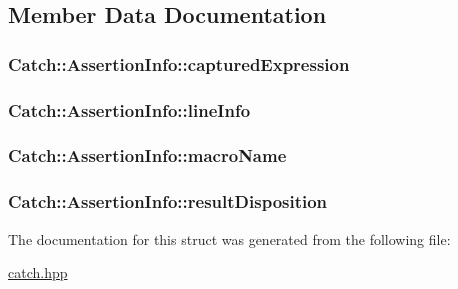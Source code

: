 \subsection{Member Data Documentation}
\hypertarget{struct_catch_1_1_assertion_info_accd36744b4acaa3a691a72df0b42190f}{
\subsubsection[{captured\-Expression}]{ Catch\-::\-Assertion\-Info\-::captured\-Expression}}\label{struct_catch_1_1_assertion_info_accd36744b4acaa3a691a72df0b42190f}
\hypertarget{struct_catch_1_1_assertion_info_a17bdbb404ba12658034f833be2f4c3e7}{
\subsubsection[{line\-Info}]{ Catch\-::\-Assertion\-Info\-::line\-Info}}\label{struct_catch_1_1_assertion_info_a17bdbb404ba12658034f833be2f4c3e7}
\hypertarget{struct_catch_1_1_assertion_info_aaf3fbb9f1fe09c879ba3d877584e3056}{
\subsubsection[{macro\-Name}]{ Catch\-::\-Assertion\-Info\-::macro\-Name}}\label{struct_catch_1_1_assertion_info_aaf3fbb9f1fe09c879ba3d877584e3056}
\hypertarget{struct_catch_1_1_assertion_info_a60353b3632ab2f827162f2b2d6911073}{
\subsubsection[{result\-Disposition}]{ Catch\-::\-Assertion\-Info\-::result\-Disposition}}\label{struct_catch_1_1_assertion_info_a60353b3632ab2f827162f2b2d6911073}


The documentation for this struct was generated from the following file\-:\begin{DoxyCompactItemize}
\item 
\hyperlink{catch_8hpp}{catch.\-hpp}\end{DoxyCompactItemize}
